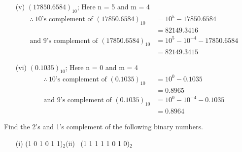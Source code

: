 \begin{solution}
\begin{itemize}
\item[(v)] $(17850.6584)_{10}$\qquad ; Here n = 5 and m = 4
\begin{align*}
\therefore~ \text{10's complement of } (17850.6584)_{10} &= 10^{5}-17850.6584\\[1pt]
&= 82149.3416\\[1pt]
\text{and 9's complement of } (17850.6584)_{10} &= 10^{5}-10^{-4}-17850.6584\\[1pt]
&= 82149.3415
\end{align*}

\item[(vi)] $(0.1035)_{10}$\qquad ; Here n = 0 and m = 4
\begin{align*}
\therefore~ \text{10's complement of } (0.1035)_{10} &= 10^{0}-0.1035\\[1pt]
&= 0.8965\\[1pt]
\text{and 9's complement of } (0.1035)_{10} &= 10^{0}-10^{-4}-0.1035\\[1pt]
&= 0.8964
\end{align*}
\end{itemize}
\end{solution}

\begin{problem}\label{prob5.24}
Find the 2's and 1's complement of the following binary numbers.
\begin{itemize}
\item[(i)] (1 0 1 0 1 1)$_{2}$\qquad\quad (ii)~ (1 1 1 1 1 0 1 0)$_{2}$
\end{itemize}
\end{problem}

